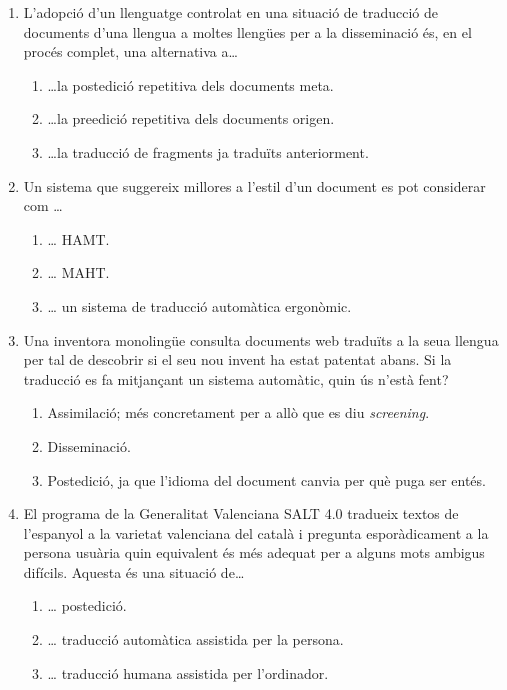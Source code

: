 \begin{enumerate}
\item L'adopció d'un llenguatge controlat en una situació de traducció
de documents d'una llengua a moltes llengües per a la disseminació
és, en el procés complet, una alternativa a{\ldots}
\begin{enumerate}
\item {\ldots}la postedició repetitiva dels documents meta.
\item {\ldots}la preedició repetitiva dels documents origen.
\item {\ldots}la traducció de fragments ja traduïts anteriorment.
\end{enumerate}

\item 
Un sistema que suggereix millores a l'estil d'un document es pot
considerar com {\ldots}

\begin{enumerate}
\item {\ldots} HAMT.
\item {\ldots} MAHT.
\item {\ldots} un sistema de traducció automàtica ergonòmic.
\end{enumerate}

\item 
Una inventora monolingüe consulta documents web traduïts a
la seua llengua per tal de descobrir si el seu nou invent ha estat
patentat abans. Si la traducció es fa mitjançant un sistema automàtic,
quin ús n'està fent?

\begin{enumerate}
\item Assimilació; més concretament per a allò que 
          es diu \emph{screening}.
\item Disseminació.
\item Postedició, ja que l'idioma del document canvia per què puga
ser entés.
\end{enumerate}

\item El programa de la Generalitat Valenciana SALT 4.0 tradueix
  textos de l'espanyol a la varietat valenciana del català i pregunta
  esporàdicament a la persona usuària quin equivalent és més adequat
  per a alguns mots ambigus difícils.  Aquesta és una situació
  de{\ldots}
   
\begin{enumerate}
\item {\ldots} postedició.
\item {\ldots} traducció automàtica assistida per la persona.
\item {\ldots} traducció humana assistida per l'ordinador.
\end{enumerate}


\end{enumerate}
